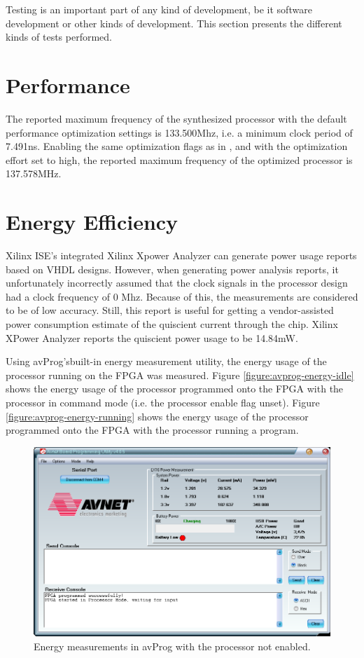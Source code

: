 Testing is an important part of any kind of development, be it software development or other kinds of development.
This section presents the different kinds of tests performed.

\section{Performance}

The reported maximum frequency of the synthesized processor with the default performance optimization settings is 133.500Mhz, i.e. a minimum clock period of 7.491ns.
Enabling the same optimization flags as in \cite{assignment-1}, and with the optimization effort set to high, the reported maximum frequency of the optimized processor is 137.578MHz.

\section{Energy Efficiency}
\label{results:energy-efficiency}

Xilinx ISE's integrated Xilinx Xpower Analyzer can generate power usage reports based on VHDL designs.
However, when generating power analysis reports, it unfortunately incorrectly assumed that the clock signals in the processor design had a clock frequency of 0 Mhz.
Because of this, the measurements are considered to be of low accuracy.
Still, this report is useful for getting a vendor-assisted power consumption estimate of the quiscient current through the chip.
Xilinx XPower Analyzer reports the quiscient power usage to be 14.84mW.

Using avProg's\cn built-in energy measurement utility, the energy usage of the processor running on the FPGA was measured.
Figure \vref{figure:avprog-energy-idle} shows the energy usage of the processor programmed onto the FPGA with the processor in command mode (i.e. the processor enable flag unset).
Figure \vref{figure:avprog-energy-running} shows the energy usage of the processor programmed onto the FPGA with the processor running a program.

\begin{figure}[H]
\includegraphics[width=\textwidth]{illustrations/paused.PNG}
\caption{Energy measurements in avProg with the processor not enabled.}
\label{figure-avprog-energy-idle}
\end{figure}

